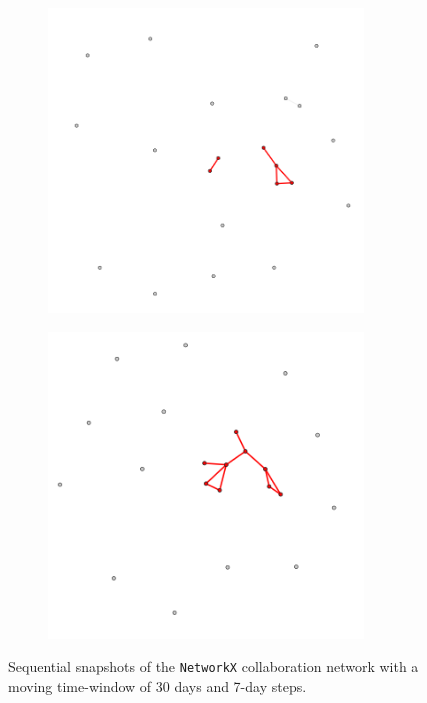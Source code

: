 \begin{figure}
\begin{subfigure}{0.3\textwidth}
        \caption{}
        \label{fig:temporal net D}
    \end{subfigure}
    \hfill
    \begin{subfigure}{0.3\textwidth}
        \centering
        \includegraphics[width=0.92\textwidth]{figures/temporal/4.png}
        \caption{}
        \label{fig:temporal net E}
    \end{subfigure}
    \hfill
    \begin{subfigure}{0.3\textwidth}
        \centering
        \includegraphics[width=0.92\textwidth]{figures/temporal/5.png}
        \caption{}
        \label{fig:temporal net F}
    \end{subfigure}
    \caption{Sequential snapshots of the \texttt{NetworkX} collaboration network with a moving time-window of 30 days and 7-day steps.}
    \label{fig:temporal net}
\end{figure}

